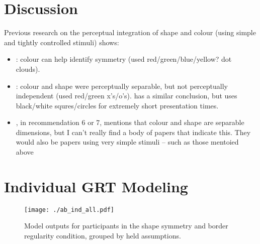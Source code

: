\documentclass[man, 12pt, a4paper,  donotrepeattitle, floatsintext, draftfirst]{apa7}
\begin{document}





\section{Discussion}
Previous research on the perceptual integration of shape and colour (using simple and tightly controlled stimuli) shows:
\begin{itemize}
    \item \cite{gheorghiu2016role}: colour can help identify symmetry (used red/green/blue/yellow? dot clouds).
    \item \cite{fitousi2018feature}: colour and shape were perceptually separable, but not perceptually independent (used red/green x's/o's). \cite{cohen1997visual} has a similar conclusion, but uses black/white squres/circles for extremely short presentation times.
    \item \cite{soto2017testing}, in recommendation 6 or 7, mentions that colour and shape are separable dimensions, but I can't really find a body of papers that indicate this. They would also be papers using very simple stimuli -- such as those mentoied above
\end{itemize}

\newpage
\printbibliography

\newpage
\appendix
\section{Individual GRT Modeling}
\label{appendix:ind_fits}

\begin{figure}[htb]
    \caption{Model outputs for participants in the shape symmetry and border regularity condition, grouped by held assumptions.}
    \centering
    \texttt{[image: ./ab\_ind\_all.pdf]}
    \label{fig:ab_all}
\end{figure}
\vfill
\end{document}
